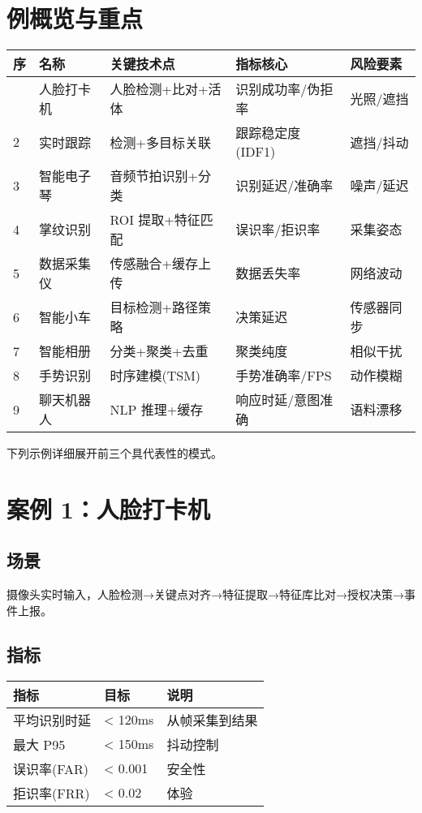 \section{例概览与重点}\label{ux4f8bux6982ux89c8ux4e0eux91cdux70b9}

\begin{longtable}[]{@{}lllll@{}}
\toprule\noalign{}
序 & 名称 & 关键技术点 & 指标核心 & 风险要素 \\
\midrule\noalign{}
\endhead
\bottomrule\noalign{}
\endlastfoot
1 & 人脸打卡机 & 人脸检测+比对+活体 & 识别成功率/伪拒率 & 光照/遮挡 \\
2 & 实时跟踪 & 检测+多目标关联 & 跟踪稳定度(IDF1) & 遮挡/抖动 \\
3 & 智能电子琴 & 音频节拍识别+分类 & 识别延迟/准确率 & 噪声/延迟 \\
4 & 掌纹识别 & ROI 提取+特征匹配 & 误识率/拒识率 & 采集姿态 \\
5 & 数据采集仪 & 传感融合+缓存上传 & 数据丢失率 & 网络波动 \\
6 & 智能小车 & 目标检测+路径策略 & 决策延迟 & 传感器同步 \\
7 & 智能相册 & 分类+聚类+去重 & 聚类纯度 & 相似干扰 \\
8 & 手势识别 & 时序建模(TSM) & 手势准确率/FPS & 动作模糊 \\
9 & 聊天机器人 & NLP 推理+缓存 & 响应时延/意图准确 & 语料漂移 \\
\end{longtable}

下列示例详细展开前三个具代表性的模式。

\section{案例
1：人脸打卡机}\label{ux6848ux4f8b-1ux4ebaux8138ux6253ux5361ux673a}

\subsection{场景}\label{ux573aux666f}

摄像头实时输入，人脸检测→关键点对齐→特征提取→特征库比对→授权决策→事件上报。

\subsection{指标}\label{ux6307ux6807}

\begin{longtable}[]{@{}lll@{}}
\toprule\noalign{}
指标 & 目标 & 说明 \\
\midrule\noalign{}
\endhead
\bottomrule\noalign{}
\endlastfoot
平均识别时延 & \textless{} 120ms & 从帧采集到结果 \\
最大 P95 & \textless{} 150ms & 抖动控制 \\
误识率(FAR) & \textless{} 0.001 & 安全性 \\
拒识率(FRR) & \textless{} 0.02 & 体验 \\
\end{longtable}

